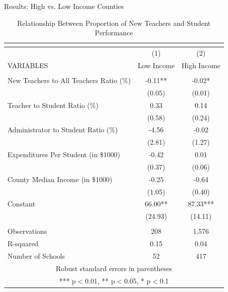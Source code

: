 \documentclass[notes]{beamer}
\begin{document}
\begin{frame}{Results: High vs. Low Income Counties}

\begin{table}[hbtp]
    \centering
    \tiny
     \caption{Relationship Between Proportion of New Teachers and Student Performance}
\begin{tabular}{lcc}
\multicolumn{3}{c}{} \\ \hline\hline 
 & (1) & (2) \\
VARIABLES & Low Income & High Income \\ \hline
 &  &  \\
\rowcolor{yellow}New Teachers to All Teachers Ratio (\%) & -0.11** & -0.02* \\
 & (0.05) & (0.01) \\
Teacher to Student Ratio (\%) & 0.33 & 0.14 \\
 & (0.58) & (0.24) \\
Administrator to Student Ratio (\%) & -4.56 & -0.02 \\
 & (2.81) & (1.27) \\
Expenditures Per Student (in \$1000) & -0.42 & 0.01 \\
 & (0.37) & (0.06) \\
County Median Income (in \$1000) & -0.25 & -0.64 \\
 & (1.05) & (0.40) \\
Constant & 66.00** & 87.33*** \\
 & (24.93) & (14.11) \\
 &  &  \\
 \hline
Observations & 208 & 1,576 \\
R-squared & 0.15 & 0.04 \\
 Number of Schools & 52 & 417 \\ \hline\hline
\multicolumn{3}{c}{ Robust standard errors in parentheses} \\
\multicolumn{3}{c}{ *** p$<$0.01, ** p$<$0.05, * p$<$0.1} \\
\end{tabular}
\end{table}
\end{frame}

\end{document}
